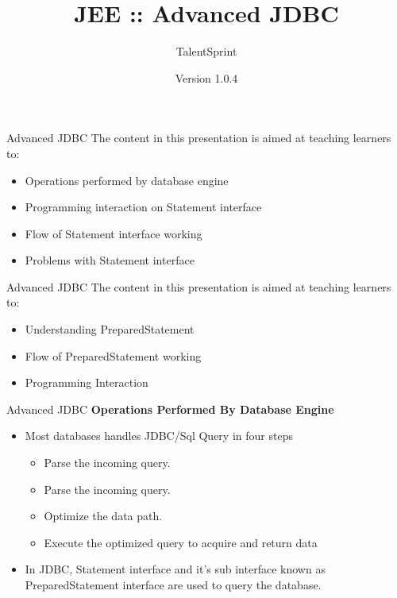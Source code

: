 \documentclass[14pt]{beamer}
\title[CP01.13 BC]{JEE :: Advanced JDBC}
\author[TS]{TalentSprint}
\institute[L\&D]{Licensed To Skill}
\date{Version 1.0.4}
\begin{document}
\begin{frame}
  \titlepage
\end{frame}

\begin{frame}{Advanced JDBC}
The content in this presentation is aimed at teaching  learners to:
\begin{itemize}
  \item Operations performed by database engine
  \item Programming interaction on Statement interface
  \item Flow of Statement interface working
  \item Problems with Statement interface
\end{itemize}
\end{frame}

\begin{frame}{Advanced JDBC}
The content in this presentation is aimed at teaching  learners to:
\begin{itemize}
  \item Understanding PreparedStatement
  \item Flow of PreparedStatement working
  \item Programming Interaction
\end{itemize}
\end{frame}


\begin{frame}{Advanced JDBC}
\textbf{Operations Performed By Database Engine}
\begin{itemize}
\item Most databases handles JDBC/Sql Query in four steps
\begin{itemize}
\item Parse the incoming query.
\item Parse the incoming query.
\item Optimize the data path.
\item Execute the optimized query to acquire and return data
\end{itemize}
\item In JDBC, Statement interface and it's sub interface known as PreparedStatement interface are used to query the database.
\end{itemize}

\end{frame}
\end{document}
